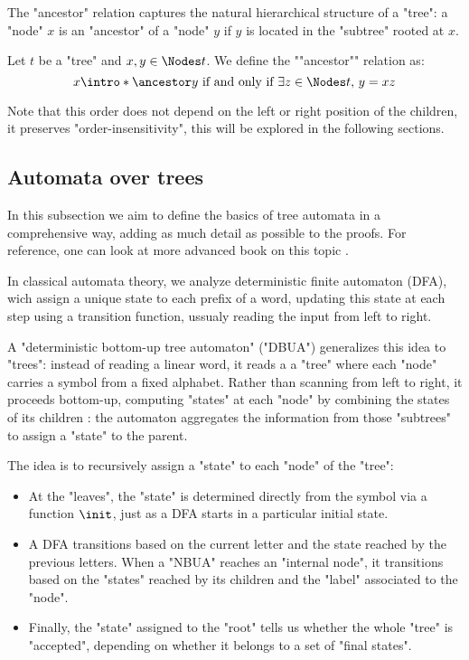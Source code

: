 \documentclass[a4paper,UKenglish,cleveref, autoref, thm-restate]{lipics-v2021}
\begin{document}
The "ancestor" relation captures the natural hierarchical structure of a "tree": a "node" $x$ is an "ancestor"
of a "node" $y$ if $y$ is located in the "subtree" rooted at $x$.

\begin{definition}
	\AP Let $t$ be a "tree" and $x, y \in \Nodes t$. We define the ""ancestor"" relation as:
	\[
		x \intro* \ancestor y \tiff \exists z \in \Nodes t,\, y = xz
	\]
\end{definition}

\begin{remark}
	Note that this order does not depend on the left or right position of the children, \ie it preserves
	"order-insensitivity", this will be explored in the following sections.
\end{remark}


\subsection{Automata over trees}\label{sec:automata}

In this subsection we aim to define the basics of tree automata in a comprehensive way, adding as much detail as possible to the proofs. For reference,
one can look at more advanced book on this topic \cite{tata,Thomas1997,bookautomata}.

In classical automata theory, we analyze deterministic finite automaton (DFA), wich assign a unique state to each prefix of
a word, updating this state at each step using a transition function, ussualy reading the input from left to right.

A "deterministic bottom-up tree automaton" ("DBUA") generalizes this idea to "trees": instead of reading a linear word, it reads a
a "tree" where each "node" carries a symbol from a fixed alphabet. Rather than scanning from left to right, it proceeds
bottom-up, computing "states" at each "node" by combining the states of its children :
the automaton aggregates the information from those "subtrees" to assign a "state" to the parent.

The idea is to recursively assign a "state" to each "node" of the "tree":
\begin{itemize}
	\item At the "leaves", the "state" is determined directly from the symbol via a function $\init$, just as a DFA starts in a particular initial state.
	\item A DFA transitions based on the current letter and the state reached by the previous letters.
	      When a "NBUA" reaches an "internal node", it transitions based on the "states" reached by its children and the "label" associated to the "node".
	\item Finally, the "state" assigned to the "root" tells us whether the whole "tree" is "accepted",
	      depending on whether it belongs to a set of "final states".
\end{itemize}
\end{document}
